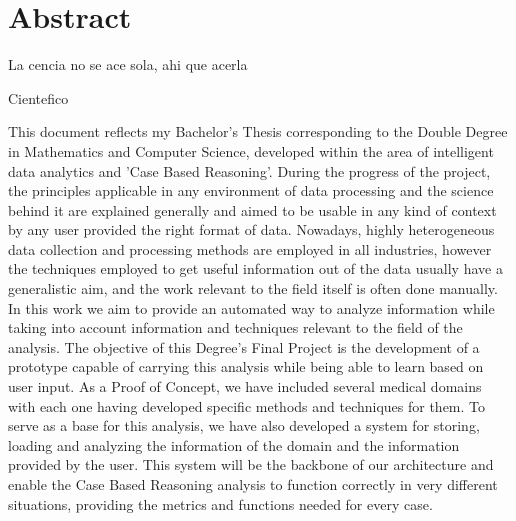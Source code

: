 %
%
%
%
%

\chapter{Abstract}

\begin{FraseCelebre}
\begin{Frase}
La cencia no se ace sola, ahi que acerla
\end{Frase}
\begin{Fuente}
Cientefico
\end{Fuente}
\end{FraseCelebre}

This document reflects my Bachelor's Thesis corresponding to the Double Degree in Mathematics and Computer Science, developed within the area of intelligent data analytics and 'Case Based Reasoning'. 
During the progress of the project, the principles applicable in any environment of data processing and the science behind it are explained generally and aimed to be usable in any kind of context by any user provided the right format of data.
Nowadays, highly heterogeneous data collection and processing methods are employed in all industries, 
however the techniques employed to get useful information out of the data usually have a generalistic aim, 
and the work relevant to the field itself is often done manually. In this work we aim to provide an automated way to analyze information while taking into account information and techniques relevant to the field of the analysis.
The objective of this Degree's Final Project is the development of a prototype capable of carrying this analysis while being able to learn based on user input. As a Proof of Concept, we have included several medical domains with each one having developed specific methods and techniques for them.
To serve as a base for this analysis, we have also developed a system for storing, loading and analyzing the information of the domain and the information provided by the user. This system will be the backbone of our architecture and enable the Case Based Reasoning analysis to function correctly in very different situations, providing the metrics and functions needed for every case.

